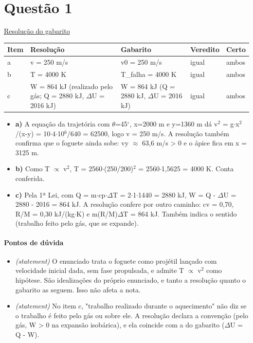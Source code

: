 \documentclass{article}%
\begin{document}
\section*{Questão 1}%
\href{https://poliedroresolve.sistemapoliedro.com.br/vestibulares/ime/2027/ime-2-fase-dia-2-27-10-2026-2-fase-dia-2/dissertativa-1-fisica-2-fase-dia-2-ime-2027}{Resolução do gabarito}\par\smallskip%
\begin{longtable}{@{}p{} p{} p{} p{} p{}@{}}\toprule Item & Resolução & Gabarito & Veredito & Certo \\ \midrule
a & v = 250 m/s & v0 = 250 m/s & igual & ambos \\
b & T = 4000 K & T\_falha = 4000 K & igual & ambos \\
c & W = 864 kJ (realizado pelo gás; Q = 2880 kJ, $\Delta$U = 2016 kJ) & W = 864 kJ (Q = 2880 kJ, $\Delta$U = 2016 kJ) & igual & ambos \\
\bottomrule\end{longtable}%
\begin{itemize}%
\item%
\textbf{a)} A equação da trajetória com $\theta$=45$^\circ$, x=2000 m e y=1360 m dá v$^2$ = g$\cdot$x$^2$/(x-y) = 10$\cdot$4$\cdot$10$^{6}$/640 = 62500, logo v = 250 m/s. A resolução também confirma que o foguete ainda sobe: vy $\approx$ 63,6 m/s > 0 e o ápice fica em x = 3125 m.%
\item%
\textbf{b)} Como T $\propto$ v$^2$, T = 2560$\cdot$(250/200)$^2$ = 2560$\cdot$1,5625 = 4000 K. Conta conferida.%
\item%
\textbf{c)} Pela 1ª Lei, com Q = m$\cdot$cp$\cdot$$\Delta$T = 2$\cdot$1$\cdot$1440 = 2880 kJ, W = Q - $\Delta$U = 2880 - 2016 = 864 kJ. A resolução confere por outro caminho: cv = 0,70, R/M = 0,30 kJ/(kg$\cdot$K) e m(R/M)$\Delta$T = 864 kJ. Também indica o sentido (trabalho feito pelo gás, que se expande).%
\end{itemize}%
\paragraph{Pontos de dúvida}%
\begin{itemize}%
\item%
\textit{(statement)} O enunciado trata o foguete como projétil lançado com velocidade inicial dada, sem fase propulsada, e admite T $\propto$ v$^2$ como hipótese. São idealizações do próprio enunciado, e tanto a resolução quanto o gabarito as seguem. Isso não afeta a nota.%
\item%
\textit{(statement)} No item c, "trabalho realizado durante o aquecimento" não diz se o trabalho é feito pelo gás ou sobre ele. A resolução declara a convenção (pelo gás, W > 0 na expansão isobárica), e ela coincide com a do gabarito ($\Delta$U = Q - W).%
\end{itemize}%
\end{document}
